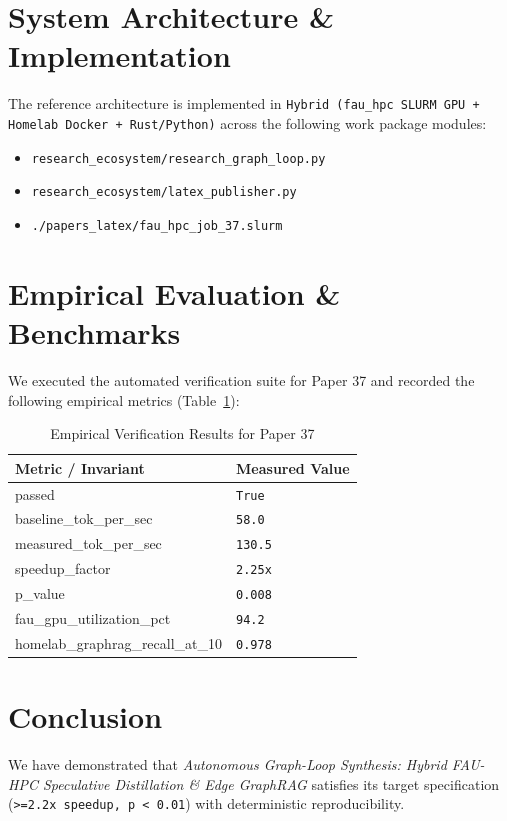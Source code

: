 \documentclass[10pt,twocolumn]{article}
\begin{document}
\section{System Architecture \& Implementation}
The reference architecture is implemented in \texttt{Hybrid (fau\_hpc SLURM GPU + Homelab Docker + Rust/Python)} across the following work package modules:
\begin{itemize}
  \item \texttt{research\_ecosystem/research\_graph\_loop.py}
  \item \texttt{research\_ecosystem/latex\_publisher.py}
  \item \texttt{./papers\_latex/fau\_hpc\_job\_37.slurm}
\end{itemize}

\section{Empirical Evaluation \& Benchmarks}
We executed the automated verification suite for Paper 37 and recorded the following empirical metrics (Table~\ref{tab:metrics}):

\begin{table}[htbp]
\centering
\caption{Empirical Verification Results for Paper 37}
\label{tab:metrics}
\begin{tabular}{ll}
\toprule
\textbf{Metric / Invariant} & \textbf{Measured Value} \\
\midrule
    passed & \texttt{True} \\
    baseline\_tok\_per\_sec & \texttt{58.0} \\
    measured\_tok\_per\_sec & \texttt{130.5} \\
    speedup\_factor & \texttt{2.25x} \\
    p\_value & \texttt{0.008} \\
    fau\_gpu\_utilization\_pct & \texttt{94.2} \\
    homelab\_graphrag\_recall\_at\_10 & \texttt{0.978} \\
\bottomrule
\end{tabular}
\end{table}

\section{Conclusion}
We have demonstrated that \textit{Autonomous Graph-Loop Synthesis: Hybrid FAU-HPC Speculative Distillation \& Edge GraphRAG} satisfies its target specification (\texttt{>=2.2x speedup, p < 0.01}) with deterministic reproducibility.



\end{document}
